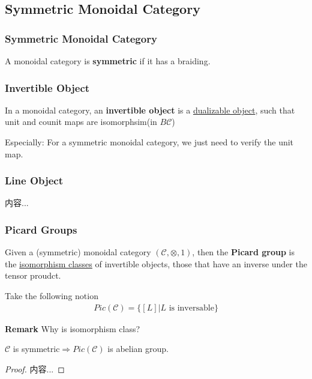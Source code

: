 \documentclass[Total.tex]{subfiles}
\begin{document}
			\subsection{Symmetric Monoidal Category}
				
				\subsubsection{Symmetric Monoidal Category}
				\begin{Def}
					A monoidal category is \textbf{symmetric} if it has a braiding.
				\end{Def}
				\subsubsection{Invertible Object}
				\begin{Def}
					In a monoidal category, an \textbf{invertible object} is a \underline{dualizable object}, such that unit and counit maps are isomorphsim(in $B\mathcal{C}$)
					
					Especially: For a symmetric monoidal category, we just need to verify the unit map.
				\end{Def}
				\subsubsection{Line Object}
					\begin{Def}
						内容...
					\end{Def}
				\subsubsection{Picard Groups}
				\begin{Def}
					Given a (symmetric) monoidal category $(\mathcal{C},\otimes,1)$, then the \textbf{Picard group} is the \underline{isomorphism classes} of invertible objects, those that have an inverse under the tensor proudct.
					
					Take the following notion
					\begin{gather*}
						Pic(\mathcal{C})=\{[L]|L\mbox{ is inversable}\}
					\end{gather*}
				\end{Def}
				
				\textbf{Remark} Why is isomorphism class?
				
				\begin{proposition}
					$\mathcal{C}$ is symmetric$\Rightarrow Pic(\mathcal{C})$ is abelian group.
				\end{proposition}
				\begin{proof}
					内容...
				\end{proof}
				
\end{document}
